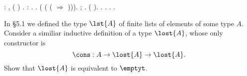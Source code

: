 \begin{coqdoccode}
\coqdocnoindent
{}  : \coqdockw{\ensuremath{\forall}}   ,    ( ) \coqdocnotation{=}  .\coqdoceol
\coqdocemptyline
\coqdocnoindent
{}  :  .\coqdoceol
\coqdocnoindent
{}.\coqdoceol
\coqdocindent{1.00em}
 (  ( ( \coqdocvar{\_} \ensuremath{\Rightarrow} ))).\coqdoceol
\coqdocindent{1.00em}
 ;  .\coqdoceol
\coqdocindent{1.00em}
 ( ).\coqdoceol
\coqdocindent{1.00em}
 .\coqdoceol
\coqdocnoindent
{}.\coqdoceol
\coqdocemptyline
\coqdocnoindent
{} .\coqdoceol
\coqdocnoindent
{} .\coqdoceol
\coqdocemptyline
\end{coqdoccode}
In \S5.1 we defined the type $\lst{A}$ of finite lists of elements of some
type $A$.  Consider a similiar inductive definition of a type $\lost{A}$, whose
only constructor is
\[
  \cons : A \to \lost{A} \to \lost{A}.
\]
Show that $\lost{A}$ is equivalent to $\emptyt$.


